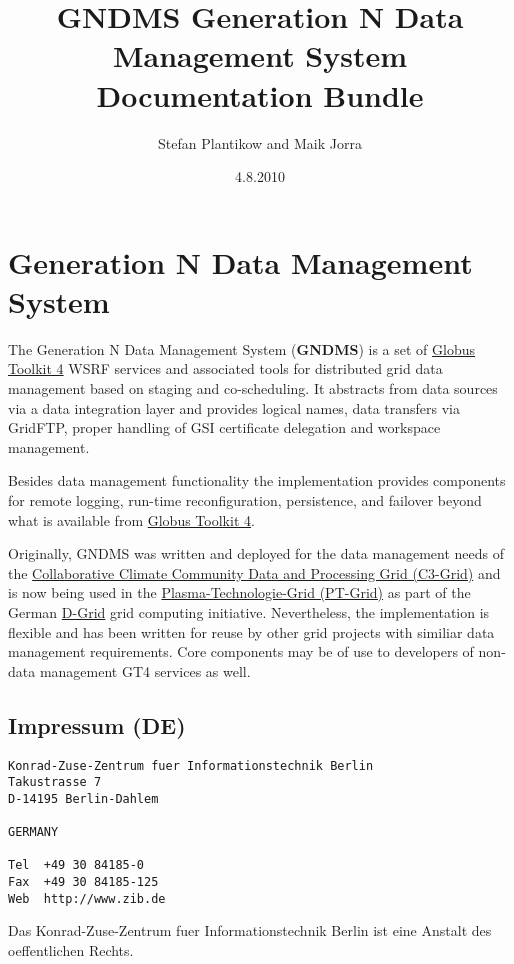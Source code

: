 \documentclass{article}
\title{GNDMS Generation N Data Management System Documentation Bundle}
\author{Stefan Plantikow and Maik Jorra}
\date{4.8.2010}
\begin{document}
\maketitle

\tableofcontents

\newpage


\section{Generation N Data Management System}

The Generation N Data Management System (\textbf{GNDMS}) is a set
of \href{http://www.globus.org}{Globus Toolkit 4} WSRF services and
associated tools for distributed grid data management based on
staging and co-scheduling. It abstracts from data sources via a
data integration layer and provides logical names, data transfers
via GridFTP, proper handling of GSI certificate delegation and
workspace management.

Besides data management functionality the implementation provides
components for remote logging, run-time reconfiguration,
persistence, and failover beyond what is available from
\href{http://www.globus.org}{Globus Toolkit 4}.

Originally, GNDMS was written and deployed for the data management
needs of the
\href{http://www.c3grid.de}{Collaborative Climate Community Data and Processing Grid (C3-Grid)}
and is now being used in the
\href{http://www.pt-grid.de}{Plasma-Technologie-Grid (PT-Grid)} as
part of the German \href{http://www.dgrid.de}{D-Grid} grid
computing initiative. Nevertheless, the implementation is flexible
and has been written for reuse by other grid projects with similiar
data management requirements. Core components may be of use to
developers of non-data management GT4 services as well.

\subsection{Impressum (DE)}

\begin{verbatim}
Konrad-Zuse-Zentrum fuer Informationstechnik Berlin
Takustrasse 7
D-14195 Berlin-Dahlem

GERMANY

Tel  +49 30 84185-0
Fax  +49 30 84185-125
Web  http://www.zib.de
\end{verbatim}

Das Konrad-Zuse-Zentrum fuer Informationstechnik Berlin ist eine Anstalt des oeffentlichen Rechts.
\end{document}
